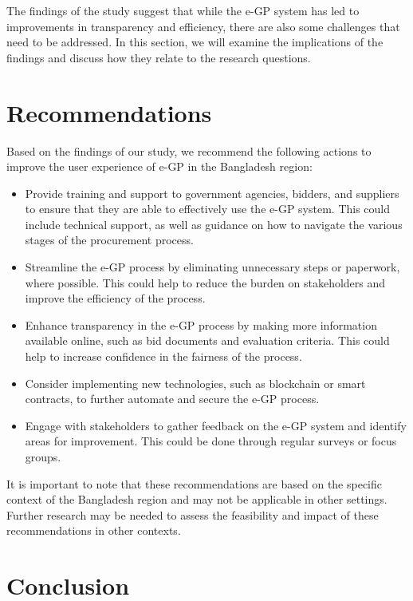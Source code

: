 \documentclass{report}
\begin{document}
The findings of the study suggest that while the e-GP system has led to improvements in transparency and efficiency, there are also some challenges that need to be addressed. In this section, we will examine the implications of the findings and discuss how they relate to the research questions.

\section{Recommendations}

Based on the findings of our study, we recommend the following actions to improve the user experience of e-GP in the Bangladesh region:

\begin{itemize}
    \item Provide training and support to government agencies, bidders, and suppliers to ensure that they are able to effectively use the e-GP system. This could include technical support, as well as guidance on how to navigate the various stages of the procurement process.
    \item Streamline the e-GP process by eliminating unnecessary steps or paperwork, where possible. This could help to reduce the burden on stakeholders and improve the efficiency of the process.
    \item Enhance transparency in the e-GP process by making more information available online, such as bid documents and evaluation criteria. This could help to increase confidence in the fairness of the process.
    \item Consider implementing new technologies, such as blockchain or smart contracts, to further automate and secure the e-GP process.
    \item Engage with stakeholders to gather feedback on the e-GP system and identify areas for improvement. This could be done through regular surveys or focus groups.
\end{itemize}

It is important to note that these recommendations are based on the specific context of the Bangladesh region and may not be applicable in other settings. Further research may be needed to assess the feasibility and impact of these recommendations in other contexts.


\section{Conclusion}
\end{document}
